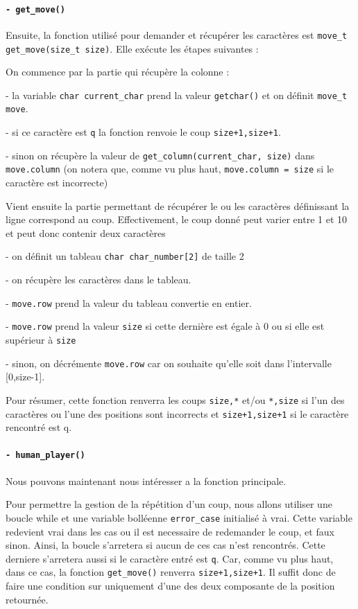\documentclass{report}
\begin{document}
\paragraph{\texttt{- get\_move() }}

Ensuite, la fonction utilisé pour demander et récupérer les caractères est \texttt{move\_t get\_move(size\_t size)}. Elle exécute les étapes suivantes :

On commence par la partie qui récupère la colonne :

- la variable \texttt{char current\_char} prend la valeur \texttt{getchar()} et on définit \texttt{move\_t move}.

- si ce caractère est \texttt{q} la fonction renvoie le coup \texttt{{size+1,size+1}}.

- sinon on récupère la valeur de \texttt{get\_column(current\_char, size)} dans \texttt{move.column} (on notera que, comme vu plus haut, \texttt{move.column = size} si le caractère est incorrecte)
\newline

Vient ensuite la partie permettant de récupérer le ou les caractères définissant la ligne correspond au coup. Effectivement, le coup donné peut varier entre 1 et 10 et peut donc contenir deux caractères

- on définit un tableau \texttt{char char\_number[2]} de taille 2

- on récupère les caractères dans le tableau.

- \texttt{move.row} prend la valeur du tableau convertie en entier.

- \texttt{move.row} prend la valeur \texttt{size} si cette dernière est égale à 0 ou si elle est supérieur à \texttt{size}

- sinon, on décrémente \texttt{move.row} car on souhaite qu'elle soit dans l'intervalle [0,size-1].

Pour résumer, cette fonction renverra les coups \texttt{size,*} et/ou \texttt{*,size} si l'un des caractères ou l'une des positions sont incorrects et \texttt{size+1,size+1} si le caractère rencontré est q.

\paragraph{\texttt{- human\_player() }}
Nous pouvons maintenant nous intéresser a la fonction principale.


Pour permettre la gestion de la répétition d'un coup, nous allons utiliser une boucle while et une variable bolléenne \texttt{error\_case} initialisé à vrai. Cette variable redevient vrai dans les cas ou il est necessaire de redemander le coup, et faux sinon. Ainsi, la boucle s'arretera si aucun de ces cas n'est rencontrés.
Cette derniere s'arretera aussi si le caractère entré est \texttt{q}.
Car, comme vu plus haut, dans ce cas, la fonction \texttt{get\_move()} renverra \texttt{size+1,size+1}. Il suffit donc de faire une condition sur uniquement d'une des deux composante de la position retournée.
\end{document}
